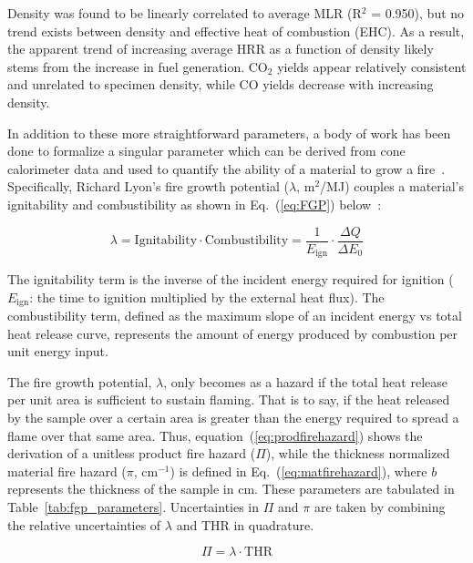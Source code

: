 \documentclass[12pt]{article}
\begin{document}
Density was found to be linearly correlated to average MLR (R$^2$ = 0.950), but no trend exists between density and effective heat of combustion (EHC). As a result, the apparent trend of increasing average HRR as a function of density likely stems from the increase in fuel generation. CO$_2$ yields appear relatively consistent and unrelated to specimen density, while CO yields decrease with increasing density. 

In addition to these more straightforward parameters, a body of work has been done to formalize a singular parameter which can be derived from cone calorimeter data and used to quantify the ability of a material to grow a fire~\cite{vahabi2023flame,tewarson1994flammability,quintiere2009inherent}. Specifically, Richard Lyon's fire growth potential ($\lambda$, m$^2$/MJ) couples a material's ignitability and combustibility as shown in Eq.~(\ref{eq:FGP}) below~\cite{lyon2024measuring}:

\begin{equation}
\lambda = \text{Ignitability} \cdot \text{Combustibility} = \frac{1}{E_{\text{ign}}} \cdot \frac{\Delta Q}{\Delta E_0}
\label{eq:FGP}
\end{equation}

The ignitability term is the inverse of the incident energy required for ignition ($E_{\text{ign}}$: the time to ignition multiplied by the external heat flux). The combustibility term, defined as the maximum slope of an incident energy vs total heat release curve, represents the amount of energy produced by combustion per unit energy input.

The fire growth potential, $\lambda$, only becomes as a hazard if the total heat release per unit area is sufficient to sustain flaming. That is to say, if the heat released by the sample over a certain area is greater than the energy required to spread a flame over that same area. Thus, 
equation~(\ref{eq:prodfirehazard}) shows the derivation of a unitless product fire hazard ($\Pi$), while the thickness normalized material fire hazard ($\pi$, cm$^{-1}$) is defined in Eq.~(\ref{eq:matfirehazard}), where $b$ represents the thickness of the sample in cm. These parameters are tabulated in Table~\ref{tab:fgp_parameters}. Uncertainties in $\Pi$ and $\pi$ are taken by combining the relative uncertainties of $\lambda$ and THR in quadrature.

\begin{equation}
\Pi = \lambda \cdot \text{THR}
\label{eq:prodfirehazard}
\end{equation}
\end{document}
